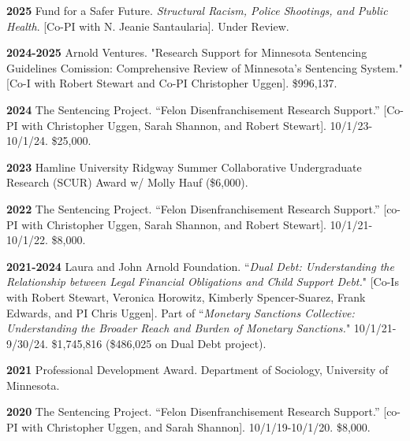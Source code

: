 \documentclass[letterpaper]{article}
\newenvironment{publist}{%
  \begin{list}{}{%
    \setlength{\leftmargin}{0cm}   %
    \setlength{\labelwidth}{2cm}     %
    \setlength{\labelsep}{0.5cm}     %
  }%
}{%
  \end{list}%
}
\begin{document}
\begin{publist}

\item[\textbf{2025}] Fund for a Safer Future. \textit{Structural Racism, Police Shootings, and Public Health}. [Co-PI with N. Jeanie Santaularia]. Under Review.  

\item[\textbf{2024-2025}] Arnold Ventures. "Research Support for Minnesota Sentencing Guidelines Comission: Comprehensive Review of Minnesota's Sentencing System." [Co-I with Robert Stewart and Co-PI Christopher Uggen]. \$996,137. 

\item[\textbf{2024}] The Sentencing Project. “Felon Disenfranchisement Research Support.” [Co-PI with Christopher Uggen, Sarah Shannon, and Robert Stewart]. 10/1/23-10/1/24. \$25,000.

\item[\textbf{2023}] Hamline University Ridgway Summer Collaborative Undergraduate Research (SCUR) Award w/ Molly Hauf (\$6,000).

\item[\textbf{2022}]The Sentencing Project. “Felon Disenfranchisement Research Support.” [co-PI with Christopher Uggen, Sarah Shannon, and Robert Stewart]. 10/1/21-10/1/22. \$8,000.

\item[\textbf{2021-2024}]  Laura and John Arnold Foundation. ``\textit{Dual Debt: Understanding the Relationship between Legal Financial Obligations and Child Support Debt.}" [Co-Is with Robert Stewart, Veronica Horowitz, Kimberly Spencer-Suarez, Frank Edwards, and PI Chris Uggen]. Part of ``\textit{Monetary Sanctions Collective: Understanding the Broader Reach and Burden of Monetary Sanctions.}" 10/1/21-9/30/24. \$1,745,816 (\$486,025 on Dual Debt project).

\item[\textbf{2021}] Professional Development Award. Department of Sociology, University of Minnesota. 

\item[\textbf{2020}] The Sentencing Project. “Felon Disenfranchisement Research Support.” [co-PI with Christopher Uggen, and Sarah Shannon]. 10/1/19-10/1/20. \$8,000.


\end{publist}
\end{document}
